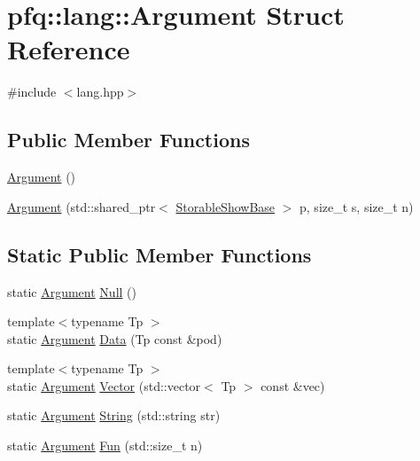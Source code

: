 \hypertarget{structpfq_1_1lang_1_1Argument}{\section{pfq\+:\+:lang\+:\+:Argument Struct Reference}
\label{structpfq_1_1lang_1_1Argument}
}


{\ttfamily \#include $<$lang.\+hpp$>$}

\subsection*{Public Member Functions}
\begin{DoxyCompactItemize}
\item 
\hyperlink{structpfq_1_1lang_1_1Argument_afaf71c8c26efb0217437393eadf43d9e}{Argument} ()
\item 
\hyperlink{structpfq_1_1lang_1_1Argument_aa5bb138a6566a3c17c6b9ab87ceefa7a}{Argument} (std\+::shared\+\_\+ptr$<$ \hyperlink{structpfq_1_1lang_1_1StorableShowBase}{Storable\+Show\+Base} $>$ p, size\+\_\+t s, size\+\_\+t n)
\end{DoxyCompactItemize}
\subsection*{Static Public Member Functions}
\begin{DoxyCompactItemize}
\item 
static \hyperlink{structpfq_1_1lang_1_1Argument}{Argument} \hyperlink{structpfq_1_1lang_1_1Argument_a47b27b590b495ac9e990d850f3052aad}{Null} ()
\item 
{\footnotesize template$<$typename Tp $>$ }\\static \hyperlink{structpfq_1_1lang_1_1Argument}{Argument} \hyperlink{structpfq_1_1lang_1_1Argument_ae9ded6ceab4dd43be420763bed00f2c3}{Data} (Tp const \&pod)
\item 
{\footnotesize template$<$typename Tp $>$ }\\static \hyperlink{structpfq_1_1lang_1_1Argument}{Argument} \hyperlink{structpfq_1_1lang_1_1Argument_a4dc906b330284d955fdc699ea3217da5}{Vector} (std\+::vector$<$ Tp $>$ const \&vec)
\item 
static \hyperlink{structpfq_1_1lang_1_1Argument}{Argument} \hyperlink{structpfq_1_1lang_1_1Argument_aba384bb2905edc62d6700a0d61f6b05b}{String} (std\+::string str)
\item 
static \hyperlink{structpfq_1_1lang_1_1Argument}{Argument} \hyperlink{structpfq_1_1lang_1_1Argument_a774e93098c8bc9f3472facd7ddeb08ca}{Fun} (std\+::size\+\_\+t n)
\end{DoxyCompactItemize}
